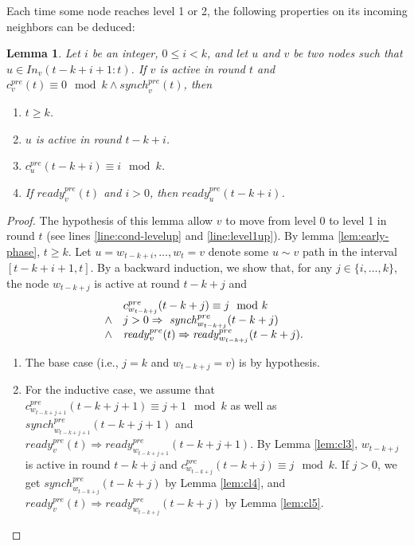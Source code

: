 \documentclass[11pt,letterpaper]{article}
\newtheorem{lem}[thm]{Lemma}
\begin{document}
Each time some node reaches level 1 or 2, the following properties on its incoming neighbors can be deduced:
\begin{lem} \label{lem:conc-safety}
	Let $i$ be an integer, $0 \leq i < k$, and let $u$ and $v$ be two nodes such that  $u\in \mathit{In}_v(t-k+i+1:t)$.
	If $v$ is active in round $t$ and $c^{pre}_v(t) \equiv 0 \mod k \wedge \mathit{synch}^{pre}_v(t)$, then
	\begin{enumerate}[label=\upshape(\alph*),ref=\thethm (\alph*)]
		\item $t \geq k$.
		\item\label{lem:active-path} $u$ is active in round $t-k+i$.
		\item $c_u^{pre}(t-k+i) \equiv i \mod k$.
		\item If $\mathit{ready}_v^{pre}(t)$ and $i > 0$, then $\mathit{ready}_u^{pre}(t-k+i)$.
	\end{enumerate}
\end{lem}
\begin{proof}
	The hypothesis of this lemma allow $v$ to move from level 0 to level 1 in round $t$
	(see lines \ref{line:cond-levelup} and \ref{line:level1up}). By lemma \ref{lem:early-phase}, $t \geq k$.
	Let $u = w_{t-k+i}, \dots, w_t = v$ denote some $u \sim v$ path in the interval $[t-k+i+1,t]$.
	By a backward induction, we show that, for any $j \in \{i, \dots, k\}$, the node $w_{t-k+j}$ is active at round $t-k + j$ and
\[\begin{array}[t]{@{}ll}
           & c_{w_{t-k+j}}^{pre}(t-k+j) \equiv j \mod k\\
    \wedge & j > 0 \Rightarrow\ \mathit{synch}_{w_{t-k+j}}^{pre}(t-k+j)\\
    \wedge & \mathit{ready}_v^{pre}(t) \Rightarrow \mathit{ready}_{w_{t-k+j}}^{pre}(t-k+j).
\end{array}\]
	\begin{enumerate}
		\item The base case (i.e., $j = k$ and $w_{t-k+j} = v$) is by hypothesis.
		\item For the inductive case, we assume that $c_{w_{t-k+j+1}}^{pre}(t-k+j+1) \equiv j+1 \mod k$ as well as $\mathit{synch}_{w_{t-k+j+1}}^{pre}(t-k+j+1)$
			and $\mathit{ready}_v^{pre}(t) \Rightarrow \mathit{ready}_{w_{t-k+j+1}}^{pre}(t-k+j+1)$.
			By Lemma \ref{lem:cl3}, $w_{t-k+j}$ is active in round $t-k+j$ and $c_{w_{t-k+j}}^{pre}(t-k+j) \equiv j \mod k$.
			If $j > 0$, we get $\mathit{synch}_{w_{t-k+j}}^{pre}(t-k+j)$ by Lemma \ref{lem:cl4},
			and $\mathit{ready}_v^{pre}(t) \Rightarrow \mathit{ready}_{w_{t-k+j}}^{pre}(t-k+j)$ by Lemma \ref{lem:cl5}.
	\end{enumerate}
\end{proof}
\end{document}
